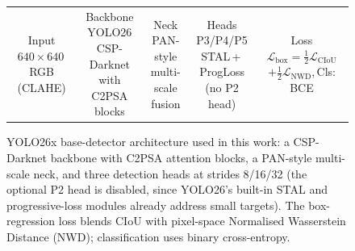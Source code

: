 \documentclass{article}
\begin{document}
\begin{figure}[t]
\centering
\setlength{\fboxsep}{3pt}
\scriptsize
\begin{tabular}{@{}c@{$\,\to\,$}c@{$\,\to\,$}c@{$\,\to\,$}c@{$\,\to\,$}c@{}}
\fbox{\parbox[c][14mm][c]{19mm}{\centering Input\\$640{\times}640$\,RGB\\(CLAHE)}} &
\fbox{\parbox[c][14mm][c]{22mm}{\centering Backbone\\YOLO26 CSP-Darknet\\with C2PSA blocks}} &
\fbox{\parbox[c][14mm][c]{22mm}{\centering Neck\\PAN-style\\multi-scale fusion}} &
\fbox{\parbox[c][14mm][c]{23mm}{\centering Heads P3/P4/P5\\STAL\,+\,ProgLoss\\(no P2 head)}} &
\fbox{\parbox[c][14mm][c]{28mm}{\centering Loss\\$\mathcal{L}_{\mathrm{box}}{=}\tfrac{1}{2}\mathcal{L}_{\mathrm{CIoU}}$\\$+\tfrac{1}{2}\mathcal{L}_{\mathrm{NWD}}$,\,Cls: BCE}} \\
\end{tabular}
\caption{YOLO26x base-detector architecture used in this work: a
CSP-Darknet backbone with C2PSA attention blocks, a PAN-style
multi-scale neck, and three detection heads at strides 8/16/32 (the
optional P2 head is disabled, since YOLO26's built-in STAL and
progressive-loss modules already address small targets). The
box-regression loss blends CIoU with pixel-space Normalised
Wasserstein Distance (NWD); classification uses binary cross-entropy.}
\label{fig:arch}
\end{figure}
\end{document}
